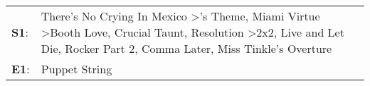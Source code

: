 \begin{supertabular}{p{0.03\textwidth}p{0.92\textwidth}}
 \textbf{S1}:  &  There's No Crying In Mexico\textsuperscript{} \textgreater {}'s Theme\textsuperscript{}, \enspace Miami Virtue\textsuperscript{} \textgreater \enspace Booth Love\textsuperscript{}, \enspace Crucial Taunt\textsuperscript{}, \enspace Resolution\textsuperscript{} \textgreater \enspace 2x2\textsuperscript{}, \enspace Live and Let Die\textsuperscript{}, \enspace Rocker Part 2\textsuperscript{}, \enspace Comma Later\textsuperscript{}, \enspace Miss Tinkle's Overture\textsuperscript{}  \enspace  \\
 \textbf{E1}:  &                                                                                                                                                                                                                                                                                                                                                                                                                                                                              Puppet String\textsuperscript{}  \enspace  \\
\end{supertabular}
